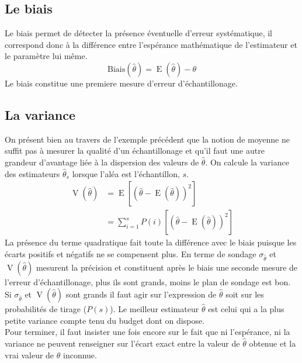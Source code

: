 \documentclass[a4paper]{article}
\DeclareMathOperator{\E}{E}
\DeclareMathOperator{\V}{V}
\begin{document}

\subsection{Le biais}
Le biais permet de détecter la présence éventuelle d'erreur systématique, il correspond donc à la différence entre l'espérance mathématique de
l'estimateur et le paramètre lui même. 
\begin{equation*}
    \text{Biais}(\hat{\theta}) = \E(\hat{\theta}) - \theta   
\end{equation*}
Le biais constitue une premiere mesure d'erreur d'échantillonage.
\subsection{La variance}
On présent bien au travers de l'exemple précédent que la notion de moyenne ne suffit pas à mesurer la qualité d'un échantillonage et qu'il faut une
autre grandeur d'avantage liée à la dispersion des valeurs de $\hat{\theta}$. On calcule la variance des estimateurs $\hat{\theta}_s$ lorsque l'aléa est
l'échantillon, $s$.
\begin{equation*}
\begin{split}
\V(\hat{\theta}) &= \E \left[ \left( \hat{\theta} - \E(\hat{\theta})  \right)^2  \right] \\
    &= \sum_{i=1}^s P(i) \left[ \left( \hat{\theta} - \E( \hat{\theta} )  \right)^2 \right]  
\end{split}
\end{equation*}
La présence du terme quadratique fait toute la différence avec le biais puisque les écarts positifs et négatifs ne se compensent plus. En terme de
sondage $\sigma_{\hat{\theta}}$ et $\V(\hat{\theta})$ mesurent la précision et constituent après le biais une seconde mesure de l'erreur 
d'échantillonage, plus ils sont grands, moins le plan de sondage est bon. Si $\sigma_{\hat{\theta}}$ et $\V(\hat{\theta})$ sont grands il faut 
agir sur l'expression de $\hat{\theta}$ soit sur les probabilités de tirage ($P(s)$). Le meilleur estimateur $\hat{\theta}$ est celui qui a la plus
petite variance compte tenu du budget dont on dispose.\\
Pour terminer, il faut insister une fois encore sur le fait que ni l'espérance, ni la variance ne peuvent renseigner sur l'écart exact entre la valeur
de $\hat{\theta}$ obtenue et la vrai valeur de $\theta$ inconnue.
\end{document}
